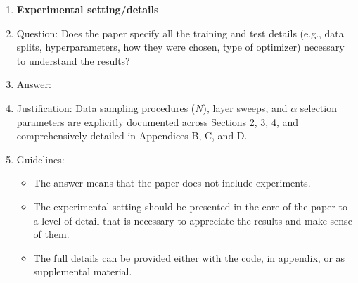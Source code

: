 \documentclass{article}
\begin{document}
\begin{enumerate}
\item {\bf Experimental setting/details}
    \item[] Question: Does the paper specify all the training and test details (e.g., data splits, hyperparameters, how they were chosen, type of optimizer) necessary to understand the results?
    \item[] Answer: \answerYes{}
    \item[] Justification: Data sampling procedures ($N$), layer sweeps, and $\alpha$ selection parameters are explicitly documented across Sections 2, 3, 4, and comprehensively detailed in Appendices B, C, and D.
    \item[] Guidelines:
    \begin{itemize}
        \item The answer \answerNA{} means that the paper does not include experiments.
        \item The experimental setting should be presented in the core of the paper to a level of detail that is necessary to appreciate the results and make sense of them.
        \item The full details can be provided either with the code, in appendix, or as supplemental material.
    \end{itemize}


\end{enumerate}
\end{document}
